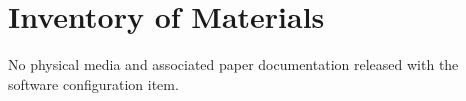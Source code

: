 
\chapter{Inventory of Materials}

No physical media and associated paper documentation released with the software configuration item.
